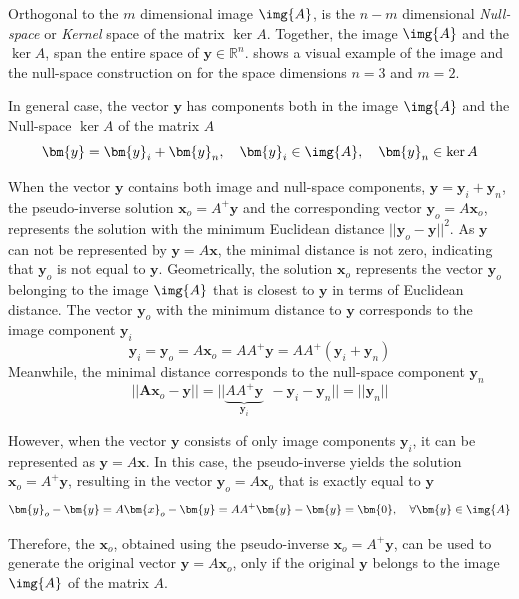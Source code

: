 Orthogonal to the $m$ dimensional image $\img{A}$, is the $n-m$ dimensional \textit{Null-space} or \textit{Kernel} space of the matrix $\ker{A}$. Together, the image $\img{A}$ and the $\ker{A}$, span the entire space of $\bm{y}\in\mathbb{R}^n$.
 shows a visual example of the image and the null-space construction on for the space dimensions $n=3$ and $m=2$.

In general case, the vector $\bm{y}$ has components both in the image $\img{A}$ and the Null-space $\ker{A}$ of the matrix $A$
\begin{equation}
    \bm{y} = \bm{y}_i + \bm{y}_n, \quad \bm{y}_i\in\img{A}, \quad  \bm{y}_n\in\ker{A}
\end{equation}

When the vector $\bm{y}$ contains both image and null-space components, $\bm{y} = \bm{y}_i + \bm{y}_n$, the pseudo-inverse solution $\bm{x}_o = A^+\bm{y}$ and the corresponding vector $\bm{y}_o = A\bm{x}_o$, represents the solution with the minimum Euclidean distance $||\bm{y}_o - \bm{y}||^2$. As $\bm{y}$ can not be represented by $\bm{y}=A\bm{x}$, the minimal distance is not zero, indicating that $\bm{y}_o$ is not equal to $\bm{y}$. Geometrically, the solution $\bm{x}_o$ represents the vector $\bm{y}_o$ belonging to the image $\img{A}$ that is closest to $\bm{y}$ in terms of Euclidean distance. The vector $\bm{y}_o$ with the minimum distance to $\bm{y}$ corresponds to the image component $\bm{y}_i$
\begin{equation}
\bm{y}_i = \bm{y}_o= A\bm{x}_o = AA^+\bm{y}=AA^+(\bm{y}_i + \bm{y}_n)
\end{equation}
Meanwhile, the minimal distance corresponds to the null-space component $\bm{y}_n$
\begin{equation}
||\bm{A}\bm{x}_o - \bm{y}|| = ||\underbrace{AA^+\bm{y}}_{\bm{y}_i} ~~ - \bm{y}_i - \bm{y}_n ||= ||\bm{y}_n ||
\end{equation}

However, when the vector $\bm{y}$ consists of only image components $\bm{y}_i$, it can be represented as $\bm{y} = A\bm{x}$. In this case, the pseudo-inverse yields the solution $\bm{x}_o = A^+\bm{y}$, resulting in the vector $\bm{y}_o = A\bm{x}_o$ that is exactly equal to $\bm{y}$
\begin{equation}
\bm{y}_o-\bm{y} = A\bm{x}_o -\bm{y} = AA^+\bm{y} - \bm{y} =\bm{0}, \quad \forall\bm{y}\in\img{A}
\end{equation}

Therefore, the $\bm{x}_o$, obtained using the pseudo-inverse $\bm{x}_o=A^+\bm{y}$, can be used to generate the original vector $\bm{y} = A\bm{x}_o$, only if the original $\bm{y}$ belongs to the image $\img{A}$ of the matrix $A$. 


